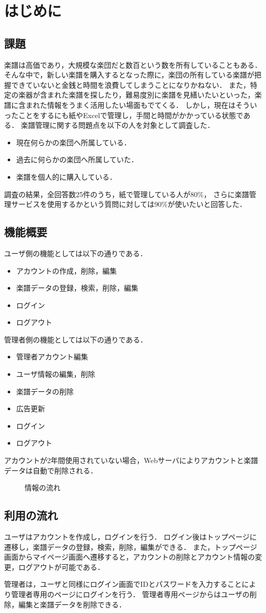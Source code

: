 \chapter{{はじめに}}
\section{課題}
楽譜は高価であり，大規模な楽団だと数百という数を所有していることもある．
そんな中で，新しい楽譜を購入するとなった際に，楽団の所有している楽譜が把握できていないと金銭と時間を浪費してしまうことになりかねない．
また，特定の楽器が含まれた楽譜を探したり，難易度別に楽譜を見繕いたいといった，楽譜に含まれた情報をうまく活用したい場面もでてくる．
しかし，現在はそういったことをするにも紙やExcelで管理し，手間と時間がかかっている状態である．
楽譜管理に関する問題点を以下の人を対象として調査した．
\begin{itemize}
    \item 現在何らかの楽団へ所属している．
    \item 過去に何らかの楽団へ所属していた．
    \item 楽譜を個人的に購入している．
\end{itemize}
調査の結果，全回答数25件のうち，紙で管理している人が80\%，
さらに楽譜管理サービスを使用するかという質問に対しては90\%が使いたいと回答した．
\section{機能概要}
ユーザ側の機能としては以下の通りである．
\begin{itemize}
    \item アカウントの作成，削除，編集
    \item 楽譜データの登録，検索，削除，編集
    \item ログイン
    \item ログアウト
\end{itemize}
管理者側の機能としては以下の通りである．
\begin{itemize}
    \item 管理者アカウント編集
    \item ユーザ情報の編集，削除
    \item 楽譜データの削除
    \item 広告更新
    \item ログイン
    \item ログアウト
\end{itemize}
アカウントが2年間使用されていない場合，Webサーバによりアカウントと楽譜データは自動で削除される．
\begin{figure}[h]
    \centering
    
    \caption{情報の流れ}
\end{figure}
\section{利用の流れ}
ユーザはアカウントを作成し，ログインを行う．
ログイン後はトップページに遷移し，楽譜データの登録，検索，削除，編集ができる．
また，トップページ画面からマイページ画面へ遷移すると，アカウントの削除とアカウント情報の変更，ログアウトが可能である．\par
管理者は，ユーザと同様にログイン画面でIDとパスワードを入力することにより管理者専用のページにログインを行う．
管理者専用ページからはユーザの削除，編集と楽譜データを削除できる．